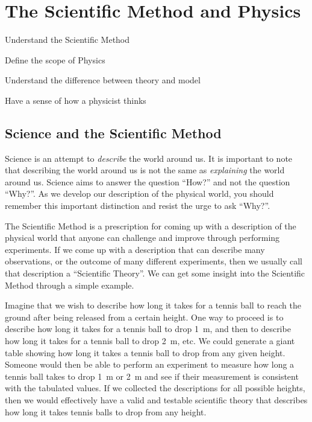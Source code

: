 %
\chapter{The Scientific Method and Physics}
\label{chap:1_Introduction}

\begin{learningObjectives}
\item Understand the Scientific Method
\item Define the scope of Physics
\item Understand the difference between theory and model
\item Have a sense of how a physicist thinks
\end{learningObjectives}

\section{Science and the Scientific Method}
Science is an attempt to \textit{describe} the world around us. It is important to note that describing the world around us is not the same as \textit{explaining} the world around us. Science aims to answer the question ``How?'' and not the question ``Why?''. As we develop our description of the physical world, you should remember this important distinction and resist the urge to ask ``Why?''.

The Scientific Method is a prescription for coming up with a description of the physical world that anyone can challenge and improve through performing experiments. If we come up with a description that can describe many observations, or the outcome of many different experiments, then we usually call that description a ``Scientific Theory''. We can get some insight into the Scientific Method through a simple example. 

Imagine that we wish to describe how long it takes for a tennis ball to reach the ground after being released from a certain height. One way to proceed is to describe how long it takes for a tennis ball to drop \SI{1}{\meter}, and then to describe how long it takes for a tennis ball to drop \SI{2}{\meter}, etc. We could generate a giant table showing how long it takes a tennis ball to drop from any given height. Someone would then be able to perform an experiment to measure how long a tennis ball takes to drop \SI{1}{\meter} or \SI{2}{\meter} and see if their measurement is consistent with the tabulated values. If we collected the descriptions for all possible heights, then we would effectively have a valid and testable scientific theory that describes how long it takes tennis balls to drop from any height.

